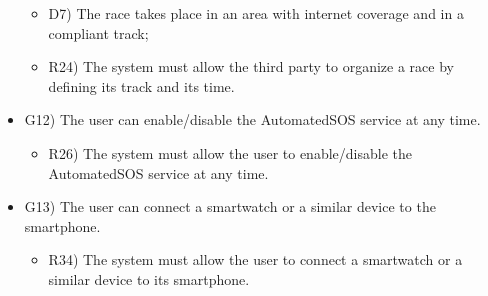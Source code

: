 \documentclass{article}
\begin{document}
\begin{legal}
\begin{legal}
\begin{legal}
\begin{itemize}
{\begin{itemize}
					\item D7) The race takes place in an area with internet coverage and in a compliant track;\\
					\item R24) The system must allow the third party to organize a race by defining its track and its time.\\
					\end{itemize}
				}
				\item G12) The user can enable/disable the AutomatedSOS service at any time.\\
				{\normalfont
					\begin{itemize}
					\item R26) The system must allow the user to enable/disable the AutomatedSOS service at any time.\\
					\end{itemize}
				}
				\item G13) The user can connect a smartwatch or a similar device to the smartphone.\\
				{\normalfont
					\begin{itemize}
					\item R34) The system must allow the user to connect a smartwatch or a similar device to its smartphone.\\
					\end{itemize}
				}
				\end{itemize}
			\end{legal}
    		

\end{legal}
\end{legal}
\end{document}
